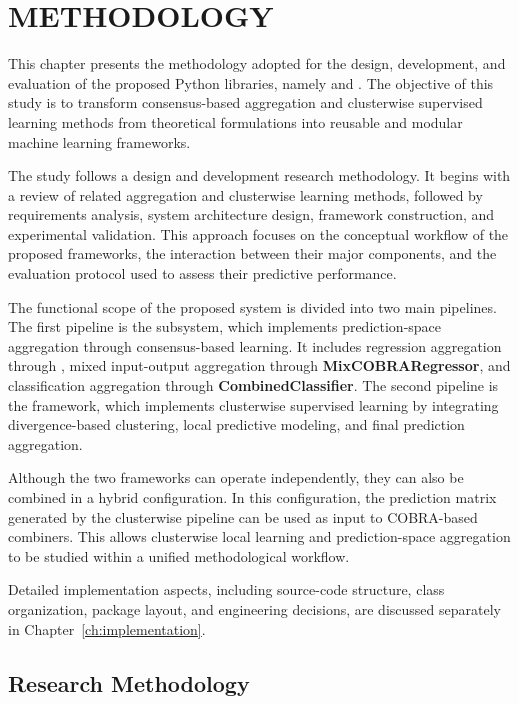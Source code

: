 \chapter{METHODOLOGY}
\label{ch:methodology}

\hs This chapter presents the methodology adopted for the design, development, and evaluation of the proposed Python libraries, namely \GradientCOBRA{} and \KFCProcedure{}. The objective of this study is to transform consensus-based aggregation and clusterwise supervised learning methods from theoretical formulations into reusable and modular machine learning frameworks.

The study follows a design and development research methodology. It begins with a review of related aggregation and clusterwise learning methods, followed by requirements analysis, system architecture design, framework construction, and experimental validation. This approach focuses on the conceptual workflow of the proposed frameworks, the interaction between their major components, and the evaluation protocol used to assess their predictive performance.

The functional scope of the proposed system is divided into two main pipelines. The first pipeline is the \GradientCOBRA{} subsystem, which implements prediction-space aggregation through consensus-based learning. It includes regression aggregation through \GradientCOBRA{}, mixed input-output aggregation through \textbf{MixCOBRARegressor}, and classification aggregation through \textbf{CombinedClassifier}. The second pipeline is the \KFCProcedure{} framework, which implements clusterwise supervised learning by integrating divergence-based clustering, local predictive modeling, and final prediction aggregation.

Although the two frameworks can operate independently, they can also be combined in a hybrid configuration. In this configuration, the prediction matrix generated by the \KFCProcedure{} clusterwise pipeline can be used as input to COBRA-based combiners. This allows clusterwise local learning and prediction-space aggregation to be studied within a unified methodological workflow.

Detailed implementation aspects, including source-code structure, class organization, package layout, and engineering decisions, are discussed separately in Chapter~\ref{ch:implementation}.



\section{Research Methodology}
\label{sec:research_methodology}

